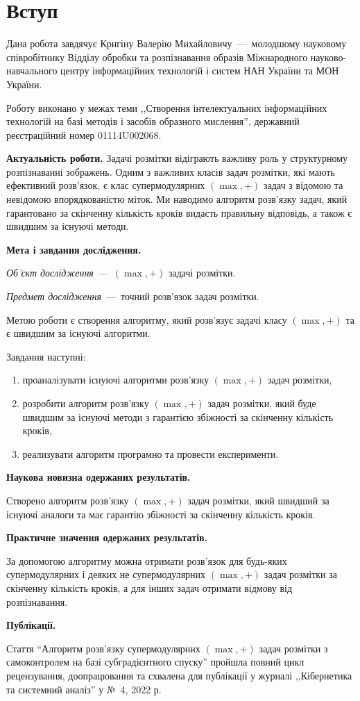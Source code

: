 \chapter*{Вступ}

Дана робота завдячує Кригіну Валерію Михайловичу~---~молодшому
науковому співробітнику Відділу обробки та розпізнавання
образів Міжнародного науково-навчального центру інформаційних
технологій і систем НАН України та МОН України.

Роботу виконано у межах теми ,,Створення інтелектуальних інформаційних
технологій на базі методів і засобів образного мислення'',
державний реєстраційний номер 01114U002068.

\textbf{Актуальність роботи.}
Задачі розмітки відіграють важливу роль у структурному розпізнаванні
зображень. Одним з важливих класів задач
розмітки, які мають ефективний розв’язок, є клас супермодулярних
\((\max,+)\) задач з відомою  та невідомою впорядкованістю міток.
Ми наводимо алгоритм розв'язку задач, який гарантовано за скінченну кількість
кроків видасть правильну відповідь, а також є швидшим за існуючі методи.

\textbf{Мета і завдання дослідження.}

\textit{Об'єкт дослідження}~---~\((\max,+)\) задачі розмітки.

\textit{Предмет дослідження}~---~точний розв’язок задач розмітки.

Метою роботи є створення алгоритму, який розв'язує задачі класу
\((\max,+)\) та є швидшим за існуючі алгоритми.

Завдання наступні:
\begin{enumerate}
  \item
    проаналізувати існуючі алгоритми розв'язку \((\max,+)\) задач розмітки,
  \item
    розробити алгоритм розв'язку \((\max,+)\) задач розмітки, який буде
    швидшим за існуючі методи з гарантією збіжності за скінченну
    кількість кроків,
  \item
    реализувати алгоритм програмно та провести експерименти.
\end{enumerate}

\textbf{Наукова новизна одержаних результатів.}

Створено алгоритм розв'язку \((\max,+)\) задач розмітки, який швидший за
існуючі аналоги та має гарантію збіжності за скінченну кількість кроків.

\textbf{Практичне значення одержаних результатів.}

За допомогою алгоритму можна отримати розв'язок для будь-яких
супермодулярних і деяких не супермодулярних \((\max,+)\) задач розмітки
за скінченну кількість кроків,
а для інших задач отримати відмову від розпізнавання.

\textbf{Публікації.}

Стаття ``Алгоритм розв'язку супермодулярних $(\max, +)$ задач
розмітки з самоконтролем на базі субградієнтного спуску''
пройшла повний цикл рецензування, доопрацювання та схвалена для
публікації у журналі
,,Кібернетика та системний аналіз'' у № 4, 2022 р.
